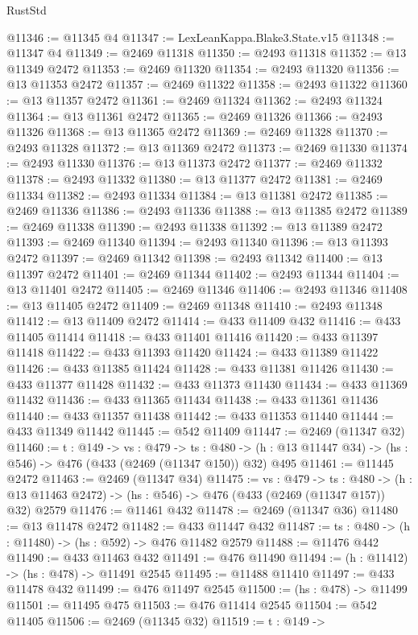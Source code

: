 \begin{lexlean}{RustStd}
\begin{coremodule}
@11346 := @11345 @4
@11347 := LexLeanKappa.Blake3.State.v15
@11348 := @11347 @4
@11349 := @2469 @11318
@11350 := @2493 @11318
@11352 := @13 @11349 @2472
@11353 := @2469 @11320
@11354 := @2493 @11320
@11356 := @13 @11353 @2472
@11357 := @2469 @11322
@11358 := @2493 @11322
@11360 := @13 @11357 @2472
@11361 := @2469 @11324
@11362 := @2493 @11324
@11364 := @13 @11361 @2472
@11365 := @2469 @11326
@11366 := @2493 @11326
@11368 := @13 @11365 @2472
@11369 := @2469 @11328
@11370 := @2493 @11328
@11372 := @13 @11369 @2472
@11373 := @2469 @11330
@11374 := @2493 @11330
@11376 := @13 @11373 @2472
@11377 := @2469 @11332
@11378 := @2493 @11332
@11380 := @13 @11377 @2472
@11381 := @2469 @11334
@11382 := @2493 @11334
@11384 := @13 @11381 @2472
@11385 := @2469 @11336
@11386 := @2493 @11336
@11388 := @13 @11385 @2472
@11389 := @2469 @11338
@11390 := @2493 @11338
@11392 := @13 @11389 @2472
@11393 := @2469 @11340
@11394 := @2493 @11340
@11396 := @13 @11393 @2472
@11397 := @2469 @11342
@11398 := @2493 @11342
@11400 := @13 @11397 @2472
@11401 := @2469 @11344
@11402 := @2493 @11344
@11404 := @13 @11401 @2472
@11405 := @2469 @11346
@11406 := @2493 @11346
@11408 := @13 @11405 @2472
@11409 := @2469 @11348
@11410 := @2493 @11348
@11412 := @13 @11409 @2472
@11414 := @433 @11409 @432
@11416 := @433 @11405 @11414
@11418 := @433 @11401 @11416
@11420 := @433 @11397 @11418
@11422 := @433 @11393 @11420
@11424 := @433 @11389 @11422
@11426 := @433 @11385 @11424
@11428 := @433 @11381 @11426
@11430 := @433 @11377 @11428
@11432 := @433 @11373 @11430
@11434 := @433 @11369 @11432
@11436 := @433 @11365 @11434
@11438 := @433 @11361 @11436
@11440 := @433 @11357 @11438
@11442 := @433 @11353 @11440
@11444 := @433 @11349 @11442
@11445 := @542 @11409
@11447 := @2469 (@11347 @32)
@11460 := {t : @149} ->
  {vs : @479} ->
  {ts : @480} -> (h : @13 @11447 @34) -> (hs : @546) -> @476 (@433 (@2469 (@11347 @150)) @32) @495
@11461 := @11445 @2472
@11463 := @2469 (@11347 @34)
@11475 := {vs : @479} ->
  {ts : @480} ->
  (h : @13 @11463 @2472) -> (hs : @546) -> @476 (@433 (@2469 (@11347 @157)) @32) @2579
@11476 := @11461 @432
@11478 := @2469 (@11347 @36)
@11480 := @13 @11478 @2472
@11482 := @433 @11447 @432
@11487 := {ts : @480} -> (h : @11480) -> (hs : @592) -> @476 @11482 @2579
@11488 := @11476 @442
@11490 := @433 @11463 @432
@11491 := @476 @11490
@11494 := (h : @11412) -> (hs : @478) -> @11491 @2545
@11495 := @11488 @11410
@11497 := @433 @11478 @432
@11499 := @476 @11497 @2545
@11500 := (hs : @478) -> @11499
@11501 := @11495 @475
@11503 := @476 @11414 @2545
@11504 := @542 @11405
@11506 := @2469 (@11345 @32)
@11519 := {t : @149} ->

\end{coremodule}
\end{lexlean}
